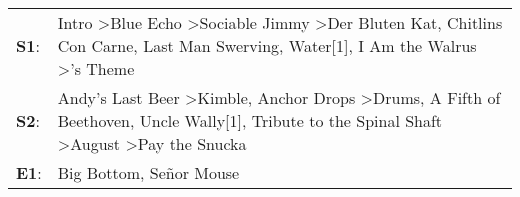\begin{supertabular}{p{0.03\textwidth}p{0.92\textwidth}}
 \textbf{S1}:  &            Intro\textsuperscript{} \textgreater \enspace Blue Echo\textsuperscript{} \textgreater \enspace Sociable Jimmy\textsuperscript{} \textgreater \enspace Der Bluten Kat\textsuperscript{}, \enspace Chitlins Con Carne\textsuperscript{}, \enspace Last Man Swerving\textsuperscript{}, \enspace Water[1]\textsuperscript{}, \enspace I Am the Walrus\textsuperscript{} \textgreater {}'s Theme\textsuperscript{}  \enspace  \\
 \textbf{S2}:  &  Andy's Last Beer\textsuperscript{} \textgreater \enspace Kimble\textsuperscript{}, \enspace Anchor Drops\textsuperscript{} \textgreater \enspace Drums\textsuperscript{}, \enspace A Fifth of Beethoven\textsuperscript{}, \enspace Uncle Wally[1]\textsuperscript{}, \enspace Tribute to the Spinal Shaft\textsuperscript{} \textgreater \enspace August\textsuperscript{} \textgreater \enspace Pay the Snucka\textsuperscript{}  \enspace  \\
 \textbf{E1}:  &                                                                                                                                                                                                                                                                                                                                                                Big Bottom\textsuperscript{}, \enspace Señor Mouse\textsuperscript{}  \enspace  \\
\end{supertabular}
